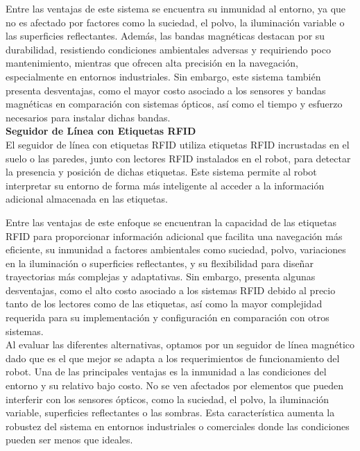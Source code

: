 Entre las ventajas de este sistema se encuentra su inmunidad al entorno, ya que no es afectado por factores como la suciedad, el polvo, la iluminación variable o las superficies reflectantes. Además, las bandas magnéticas destacan por su durabilidad, resistiendo condiciones ambientales adversas y requiriendo poco mantenimiento, mientras que ofrecen alta precisión en la navegación, especialmente en entornos industriales. Sin embargo, este sistema también presenta desventajas, como el mayor costo asociado a los sensores y bandas magnéticas en comparación con sistemas ópticos, así como el tiempo y esfuerzo necesarios para instalar dichas bandas. \\


\textbf{Seguidor de Línea con Etiquetas RFID} \mbox{} \vspace{6pt} \\
El seguidor de línea con etiquetas RFID utiliza etiquetas RFID incrustadas en el suelo o las paredes, junto con lectores RFID instalados en el robot, para detectar la presencia y posición de dichas etiquetas. Este sistema permite al robot interpretar su entorno de forma más inteligente al acceder a la información adicional almacenada en las etiquetas.

Entre las ventajas de este enfoque se encuentran la capacidad de las etiquetas RFID para proporcionar información adicional que facilita una navegación más eficiente, su inmunidad a factores ambientales como suciedad, polvo, variaciones en la iluminación o superficies reflectantes, y su flexibilidad para diseñar trayectorias más complejas y adaptativas. Sin embargo, presenta algunas desventajas, como el alto costo asociado a los sistemas RFID debido al precio tanto de los lectores como de las etiquetas, así como la mayor complejidad requerida para su implementación y configuración en comparación con otros sistemas. \cite{venkateshrfidultrasonic} \\


Al evaluar las diferentes alternativas, optamos por un seguidor de línea magnético dado que es el que mejor se adapta a los requerimientos de funcionamiento del robot. Una de las principales ventajas es la inmunidad a las condiciones del entorno y su relativo bajo costo. No se ven afectados por elementos que pueden interferir con los sensores ópticos, como la suciedad, el polvo, la iluminación variable, superficies reflectantes o las sombras. Esta característica aumenta la robustez del sistema en entornos industriales o comerciales donde las condiciones pueden ser menos que ideales.

